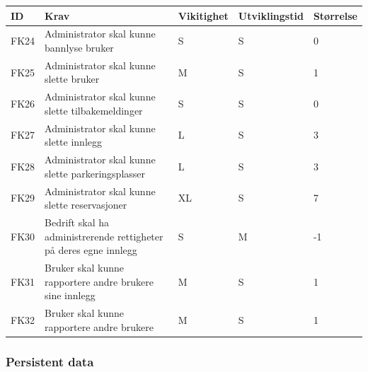 \documentclass[12pt]{article}
\newcommand{\cello}{\cellcolor{orange!25}}
\newcommand{\celly}{\cellcolor{yellow!25}}
\newcommand{\celll}{\cellcolor{lime!25}}
\newcommand{\cellg}{\cellcolor{green!25}}
\begin{document}
        \begin{tabular}{|p{2cm}|p{6cm}|
            >{\centering\arraybackslash}p{2cm}|
            >{\centering\arraybackslash}p{2cm}|
            >{\centering\arraybackslash}p{2cm}|} 
            \hline
            \bf ID & \bf Krav & \bf Vikitighet & \bf Utviklingstid & \bf Størrelse\\
            \hline
            FK24
            &
            Administrator skal kunne bannlyse bruker
            & S & S & \celly 0\\
            \hline
            FK25
            &
            Administrator skal kunne slette bruker
            & M & S & \celll 1\\
            \hline
            FK26
            &
            Administrator skal kunne slette tilbakemeldinger
            & S & S & \celly 0\\
            \hline
            FK27
            &
            Administrator skal kunne slette innlegg
            & L & S & \cellg 3\\
            \hline
            FK28
            &
            Administrator skal kunne slette parkeringsplasser
            & L & S & \cellg 3\\
            \hline
            FK29
            &
            Administrator skal kunne slette reservasjoner
            & XL & S & \cellg 7\\
            \hline
            FK30
            &
            Bedrift skal ha administrerende rettigheter på deres egne innlegg
            & S & M & \cello -1\\
            \hline
            FK31
            &
            Bruker skal kunne rapportere andre brukere sine innlegg
            & M & S & \celll 1\\
            \hline
            FK32
            &
            Bruker skal kunne rapportere andre brukere
            & M & S & \celll 1\\
            \hline
        \end{tabular}
        
        \subsubsection{Persistent data}
\end{document}
